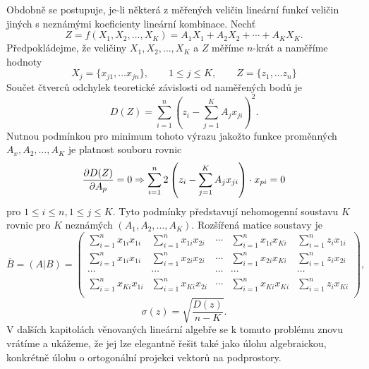       Obdobně se postupuje, je-li některá z měřených veličin lineární funkcí veličin jiných s 
      neznámými koeficienty lineární kombinace. Nechť
      \begin{equation*}
        Z = f(X_1, X_2, \ldots, X_K) = A_1X_1 + A_2X_2 + \cdots + A_KX_K.
      \end{equation*}
      Předpokládejme, že veličiny \(X_1, X_2, \ldots, X_K\) a \(Z\) měříme \(n\)-krát a naměříme 
      hodnoty
      \begin{equation*}
        X_j = \lbrace x_{j1}, \ldots x_{jn} \rbrace, \qquad 1 \leq j \leq K, \qquad 
        Z = \lbrace z_{1}, \ldots z_{n} \rbrace
      \end{equation*}
      Součet čtverců odchylek teoretické závislosti od naměřených bodů je
      \begin{equation*}
        D(Z) = \sum_{i=1}^{n}\left(z_i - \sum_{j=1}^{K}A_jx_{ji}\right)^2.
      \end{equation*}
      Nutnou podmínkou pro minimum tohoto výrazu jakožto funkce proměnných \(A_x, A_2, \ldots, A_K\)
      je platnost souboru rovnic
      \begin{equation*}
        \dfrac{\partial D(Z)}{\partial A_p} = 0 \Rightarrow 
        \sum_{i=1}^{n}2\left(z_i - \sum_{j=1}^{K}A_jx_{ji}\right)\cdot x_{pi} = 0
      \end{equation*}
      pro \(1 \leq i \leq n, 1 \leq j \leq K\). Tyto podmínky představují nehomogenní soustavu 
      \(K\) rovnic pro \(K\) neznámých \(( A_1, A_2, \ldots, A_K)\). Rozšířená matice soustavy je
      \begin{equation*}
        \overline{B} = (A|B) = 
          \left(
            \begin{array}{cccc|c}
              \sum_{i=1}^{n}x_{1i}x_{1i} & \sum_{i=1}^{n}x_{1i}x_{2i} & \cdots & 
              \sum_{i=1}^{n}x_{1i}x_{Ki} & \sum_{i=1}^{n}z_{i}x_{1i}                    \\
              \sum_{i=1}^{n}x_{1i}x_{1i} & \sum_{i=1}^{n}x_{2i}x_{2i} & \cdots & 
              \sum_{i=1}^{n}x_{2i}x_{Ki} & \sum_{i=1}^{n}z_{i}x_{2i}                    \\
                        \cdots           & \cdots & \cdots & \cdots   & \cdots          \\
              \sum_{i=1}^{n}x_{Ki}x_{1i} & \sum_{i=1}^{n}x_{Ki}x_{2i} & \cdots & 
              \sum_{i=1}^{n}x_{Ki}x_{Ki} & \sum_{i=1}^{n}z_{i}x_{Ki}                    \\
            \end{array}
          \right),
      \end{equation*}
      \begin{equation*}
        \sigma(z) = \sqrt{\dfrac{D(z)}{n - K}}.
      \end{equation*}
      V dalších kapitolách věnovaných lineární algebře se k tomuto problému znovu vrátíme a 
      ukážeme, že jej lze elegantně řešit také jako úlohu algebraickou, konkrétně úlohu o 
      ortogonální projekci vektorů na podprostory.
\printbibliography[heading=subbibliography]
